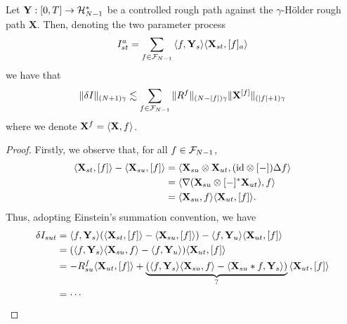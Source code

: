 \documentclass[a4paper, 10pt]{style/preprint}
\begin{document}
\begin{proposition}
  Let \(\mathbf{Y} : [0, T] \to {\mathcal H}^*_{N - 1}\) be a controlled rough path against the \(\gamma\)-H\"older 
  rough path \(\mathbf{X}\). Then, denoting the two parameter process
  \[I_{st}^a = \sum_{f \in \CF_{N - 1}} \< f, \mathbf{Y}_s\> \< \mathbf{X}_{st}, [f]_a\>\] 
  we have that 
  \[\|\delta I\|_{(N + 1)\gamma} \lesssim \sum_{f \in {\mathcal F}_{N - 1}} \|R^f\|_{(N - |f|)\gamma} \|\mathbf{X}^{[f]}\|_{(|f| + 1)\gamma}\]
  where we denote \(\mathbf{X}^f = \< \mathbf{X}, f\>\).
\end{proposition}
\begin{proof}
  Firstly, we observe that, for all \(f \in {\mathcal F}_{N - 1}\),
  \begin{align*}
    \<\mathbf{X}_{st}, [f]\> - \< \mathbf{X}_{su}, [f]\> 
    & = \< \mathbf{X}_{su} \otimes \mathbf{X}_{ut}, (\text{id} \otimes [-]) \Delta f\>\\
    & = \< \nabla (\mathbf{X}_{su} \otimes [-]^* \mathbf{X}_{ut}), f\>\\ 
    & = \< \mathbf{X}_{su}, f\> \< \mathbf{X}_{ut}, [f]\>.
  \end{align*}
  Thus, adopting Einstein's summation convention, we have
  \begin{align*}
    \delta I_{sut} & = \< f, \mathbf{Y}_s\>(\<\mathbf{X}_{st}, [f]\> - \< \mathbf{X}_{su}, [f]\>) 
      - \< f, \mathbf{Y}_u\> \< \mathbf{X}_{ut}, [f]\>\\
    & = (\< f, \mathbf{Y}_s\> \< \mathbf{X}_{su}, f\> - \< f, \mathbf{Y}_u\>) 
        \< \mathbf{X}_{ut}, [f]\>\\
    & = - R^f_{su} \< \mathbf{X}_{ut}, [f]\> 
      + \underbrace{(\< f, \mathbf{Y}_s\> \< \mathbf{X}_{su}, f\> -
          \< \mathbf{X}_{su} * f, \mathbf{Y}_s\>)}_{\text{?}}
        \< \mathbf{X}_{ut}, [f]\>\\
    & = \cdots
  \end{align*}
\end{proof}
\end{document}
